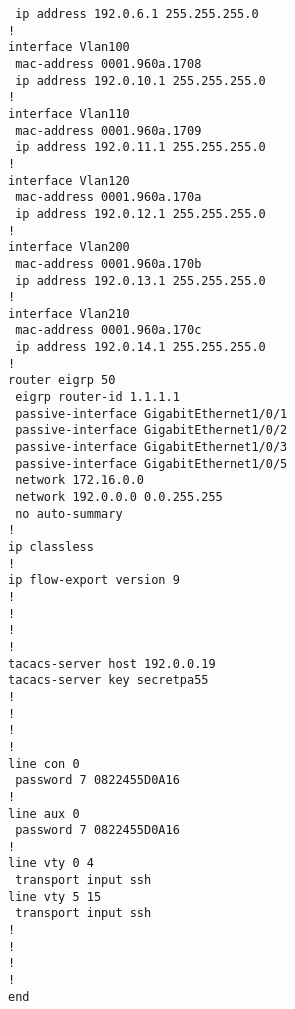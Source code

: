 \begin{verbatim}
 ip address 192.0.6.1 255.255.255.0
!
interface Vlan100
 mac-address 0001.960a.1708
 ip address 192.0.10.1 255.255.255.0
!
interface Vlan110
 mac-address 0001.960a.1709
 ip address 192.0.11.1 255.255.255.0
!
interface Vlan120
 mac-address 0001.960a.170a
 ip address 192.0.12.1 255.255.255.0
!
interface Vlan200
 mac-address 0001.960a.170b
 ip address 192.0.13.1 255.255.255.0
!
interface Vlan210
 mac-address 0001.960a.170c
 ip address 192.0.14.1 255.255.255.0
!
router eigrp 50
 eigrp router-id 1.1.1.1
 passive-interface GigabitEthernet1/0/1
 passive-interface GigabitEthernet1/0/2
 passive-interface GigabitEthernet1/0/3
 passive-interface GigabitEthernet1/0/5
 network 172.16.0.0
 network 192.0.0.0 0.0.255.255
 no auto-summary
!
ip classless
!
ip flow-export version 9
!
!
!
!
tacacs-server host 192.0.0.19
tacacs-server key secretpa55
!
!
!
!
line con 0
 password 7 0822455D0A16
!
line aux 0
 password 7 0822455D0A16
!
line vty 0 4
 transport input ssh
line vty 5 15
 transport input ssh
!
!
!
!
end
\end{verbatim}


\clearpage
